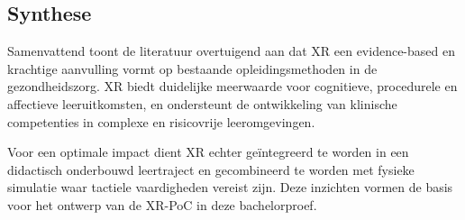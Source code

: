\subsection{Synthese}

Samenvattend toont de literatuur overtuigend aan dat XR een evidence-based en krachtige aanvulling vormt op bestaande opleidingsmethoden in de gezondheidszorg. XR biedt duidelijke meerwaarde voor cognitieve, procedurele en affectieve leeruitkomsten, en ondersteunt de ontwikkeling van klinische competenties in complexe en risicovrije leeromgevingen. 

Voor een optimale impact dient XR echter geïntegreerd te worden in een didactisch onderbouwd leertraject en gecombineerd te worden met fysieke simulatie waar tactiele vaardigheden vereist zijn. Deze inzichten vormen de basis voor het ontwerp van de XR-PoC in deze bachelorproef.